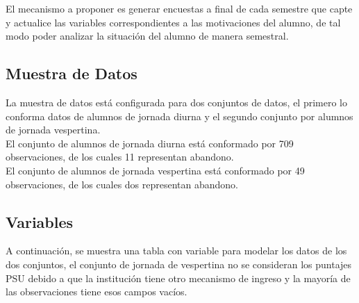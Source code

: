 El mecanismo a proponer es generar encuestas a final de cada semestre que capte y actualice las variables correspondientes a las motivaciones del alumno, de tal modo poder analizar la situación del alumno de manera semestral.\\


\subsection{Muestra de Datos}

La muestra de datos está configurada para dos conjuntos de datos, el primero lo conforma datos de alumnos de jornada diurna y el segundo conjunto por alumnos de jornada vespertina.\\

El conjunto de alumnos de jornada diurna está conformado por 709 observaciones, de los cuales 11 representan abandono.\\

El conjunto de alumnos de jornada vespertina está conformado por 49 observaciones, de los cuales dos representan abandono.\\


\subsection{Variables}

A continuación, se muestra una tabla con variable para modelar los datos de los dos conjuntos, el conjunto de jornada de vespertina no se consideran los puntajes PSU debido a que la institución tiene otro mecanismo de ingreso y la mayoría de las observaciones tiene esos campos vacíos.\\

